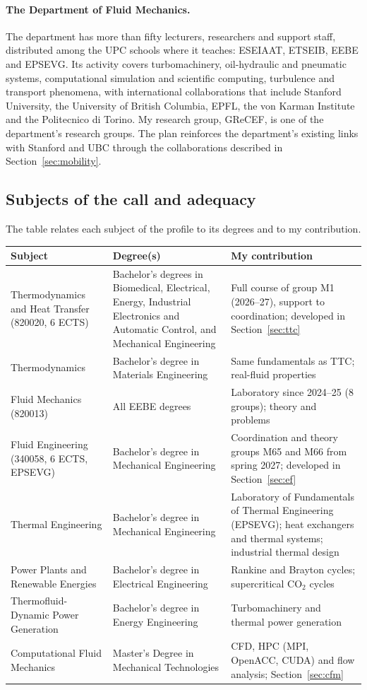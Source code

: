 \documentclass[11pt]{article}
\begin{document}
\paragraph{The Department of Fluid Mechanics.} The department has more than fifty
lecturers, researchers and support staff, distributed among the UPC schools where it
teaches: ESEIAAT, ETSEIB, EEBE and EPSEVG. Its activity covers turbomachinery,
oil-hydraulic and pneumatic systems, computational simulation and scientific computing,
turbulence and transport phenomena, with international collaborations that include
Stanford University, the University of British Columbia, EPFL, the von Karman Institute and
the Politecnico di Torino. My research group, GReCEF, is one of the department's research
groups. The plan reinforces the department's existing links with Stanford and UBC through
the collaborations described in Section~\ref{sec:mobility}.

\subsection{Subjects of the call and adequacy}
The table relates each subject of the profile to its degrees and to my contribution.
\begin{center}\small
\begin{tabularx}{\textwidth}{@{}>{\raggedright\arraybackslash}p{3.7cm}>{\raggedright\arraybackslash}p{3.9cm}X@{}}
\toprule
\textbf{Subject} & \textbf{Degree(s)} & \textbf{My contribution} \\
\midrule
Thermodynamics and Heat Transfer (820020, 6 ECTS) & Bachelor's degrees in Biomedical, Electrical, Energy, Industrial Electronics and Automatic Control, and Mechanical Engineering & Full course of group M1 (2026--27), support to coordination; developed in Section~\ref{sec:ttc} \\
Thermodynamics & Bachelor's degree in Materials Engineering & Same fundamentals as TTC; real-fluid properties \\
Fluid Mechanics (820013) & All EEBE degrees & Laboratory since 2024--25 (8 groups); theory and problems \\
Fluid Engineering (340058, 6 ECTS, EPSEVG) & Bachelor's degree in Mechanical Engineering & Coordination and theory groups M65 and M66 from spring 2027; developed in Section~\ref{sec:ef} \\
Thermal Engineering & Bachelor's degree in Mechanical Engineering & Laboratory of Fundamentals of Thermal Engineering (EPSEVG); heat exchangers and thermal systems; industrial thermal design \\
Power Plants and Renewable Energies & Bachelor's degree in Electrical Engineering & Rankine and Brayton cycles; supercritical CO$_2$ cycles \\
Thermofluid-Dynamic Power Generation & Bachelor's degree in Energy Engineering & Turbomachinery and thermal power generation \\
Computational Fluid Mechanics & Master's Degree in Mechanical Technologies & CFD, HPC (MPI, OpenACC, CUDA) and flow analysis; Section~\ref{sec:cfm} \\
\bottomrule
\end{tabularx}
\end{center}
\end{document}
